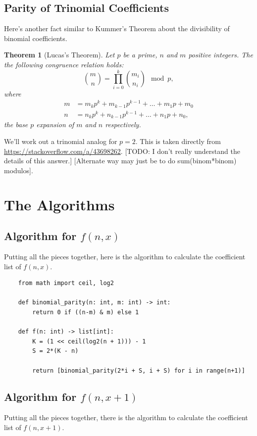 \documentclass{article}
\newtheorem{theorem}{Theorem}
\begin{document}
	\subsection{Parity of Trinomial Coefficients}
	Here's another fact similar to Kummer's Theorem about the divisibility of binomial coefficients.
	\begin{theorem}[Lucas's Theorem]
		Let $p$ be a prime, $n$ and $m$ positive integers.
		The the following congruence relation holds:
		\begin{equation*}
			\binom{m}{n} = \prod_{i=0}^{k}{\binom{m_i}{n_i}} \mod p,
		\end{equation*}
		where
		\begin{align*}
			m &= m_kp^k + m_{k-1}p^{k-1} + \dots + m_1p + m_0 \\
			n &= n_kp^k + n_{k-1}p^{k-1} + \dots + n_1p + n_0,
		\end{align*}
		the base $p$ expansion of $m$ and $n$ respectively.
	\end{theorem}

	We'll work out a trinomial analog for $p=2$.
	This is taken directly from \href{https://stackoverflow.com/a/43698262}{https://stackoverflow.com/a/43698262}.
	[TODO: I don't really understand the details of this answer.]
	[Alternate way may just be to do sum(binom*binom) modulos].

	\section{The Algorithms}
	\subsection{Algorithm for $f(n,x)$}
	Putting all the pieces together, here is the algorithm to calculate the coefficient list of $f(n,x)$.
	
	\begin{center}
	\begin{verbatim}
	from math import ceil, log2
		
	def binomial_parity(n: int, m: int) -> int:
	    return 0 if ((n-m) & m) else 1
		
	def f(n: int) -> list[int]:
	    K = (1 << ceil(log2(n + 1))) - 1
	    S = 2*(K - n)
	    
	    return [binomial_parity(2*i + S, i + S) for i in range(n+1)]
	\end{verbatim}
	\end{center}

	\subsection{Algorithm for $f(n,x+1)$}
	Putting all the pieces together, there is the algorithm to calculate the coefficient list of $f(n,x+1)$.
	
\end{document}
